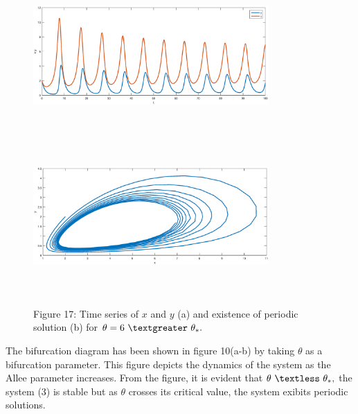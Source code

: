 \documentclass[a4paper, 10pt]{article}
\begin{document}
\begin{figure}[H]
	{\includegraphics[width=9cm, height=6cm]{24a.eps}}
	\endminipage\hfill
	{\includegraphics[width=9cm, height=6cm]{24b.eps}}
	\endminipage\hfill
	\begin{center} Figure 17: Time series of $x$ and $y$ (a) and existence of periodic solution (b) for $\theta=6~\textgreater~\theta_*.$   \end{center}
\end{figure}
The bifurcation diagram has been shown in figure 10(a-b) by taking $\theta$ as a bifurcation parameter. This figure depicts the dynamics of the system as the Allee parameter increases. From the figure, it is evident that $\theta~\textless~\theta_*,$ the system (3) is stable but as $\theta$ crosses its critical value, the system exibits periodic solutions.
\end{document}
